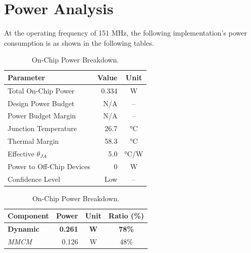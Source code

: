 \documentclass[11pt]{article}
\begin{document}
\section*{Power Analysis}

At the operating frequency of 151 MHz, the following implementation's power consumption is as shown in the following tables.

\begin{table}[H]
    \centering 
    \begin{minipage}[b]{0.46\textwidth}
        \flushleft
        \captionsetup{type=table, singlelinecheck=false, justification=raggedright, skip=2pt}
        \caption{Power Analysis Summary.}
        \label{tab:main_power}
        \small
        \begin{tabular}{lrc}
            \toprule
            \textbf{Parameter} & \textbf{Value} & \textbf{Unit} \\
            \midrule
            Total On-Chip Power            & 0.334 & W   \\
            Design Power Budget            & N/A   & --  \\
            Power Budget Margin            & N/A   & --  \\
            Junction Temperature           & 26.7  & °C  \\
            Thermal Margin                 & 58.3  & °C  \\
            Effective $\theta_{JA}$        & 5.0   & °C/W\\
            Power to Off-Chip Devices      & 0     & W   \\
            Confidence Level               & Low   & --  \\
            \bottomrule
        \end{tabular}
    \end{minipage}%
    \hfill 
    \begin{minipage}[b]{0.50\textwidth}
        \flushleft
        \captionsetup{type=table, singlelinecheck=false, justification=raggedright, skip=2pt}
        \caption{On-Chip Power Breakdown.}
        \label{tab:power_dynamic_breakdown}
        \small
        \begin{tabular}{lrcc}
            \toprule
            \textbf{Component} & \textbf{Power} & \textbf{Unit} & \textbf{Ratio (\%)} \\
            \midrule
            \textbf{Dynamic}   & \textbf{0.261} & \textbf{W} & \textbf{78\%} \\
            \quad \textit{MMCM}               & 0.126 & W & 48\% \\

\end{tabular}
\end{minipage}
\end{table}
\end{document}
